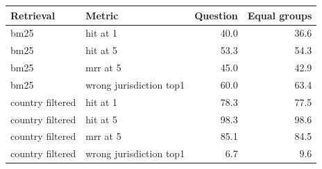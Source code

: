 \begin{tabular}{llrr}
\toprule
Retrieval & Metric & Question & Equal groups \\
\midrule
bm25 & hit at 1 & 40.0 & 36.6 \\
bm25 & hit at 5 & 53.3 & 54.3 \\
bm25 & mrr at 5 & 45.0 & 42.9 \\
bm25 & wrong jurisdiction top1 & 60.0 & 63.4 \\
country filtered & hit at 1 & 78.3 & 77.5 \\
country filtered & hit at 5 & 98.3 & 98.6 \\
country filtered & mrr at 5 & 85.1 & 84.5 \\
country filtered & wrong jurisdiction top1 & 6.7 & 9.6 \\
\bottomrule
\end{tabular}
